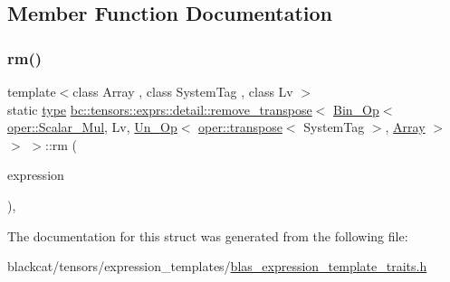\subsection{Member Function Documentation}
\mbox{\label{structbc_1_1tensors_1_1exprs_1_1detail_1_1remove__transpose_3_01Bin__Op_3_01oper_1_1Scalar__Mul_66d4ba5d587ca66fdce7c61c9a3f28e3_a3da4bd97ac2349ef2f88c949594846fc}} 
\subsubsection{\texorpdfstring{rm()}{rm()}}
{\footnotesize\ttfamily template$<$class Array , class System\+Tag , class Lv $>$ \\
static \hyperlink{structbc_1_1tensors_1_1exprs_1_1detail_1_1remove__transpose_3_01Bin__Op_3_01oper_1_1Scalar__Mul_66d4ba5d587ca66fdce7c61c9a3f28e3_a7fed62515e6f0c29ccb40182677a96c7}{type} \hyperlink{structbc_1_1tensors_1_1exprs_1_1detail_1_1remove__transpose}{bc\+::tensors\+::exprs\+::detail\+::remove\+\_\+transpose}$<$ \hyperlink{structbc_1_1tensors_1_1exprs_1_1Bin__Op}{Bin\+\_\+\+Op}$<$ \hyperlink{structbc_1_1oper_1_1Scalar__Mul}{oper\+::\+Scalar\+\_\+\+Mul}, Lv, \hyperlink{structbc_1_1tensors_1_1exprs_1_1Un__Op}{Un\+\_\+\+Op}$<$ \hyperlink{structbc_1_1oper_1_1transpose}{oper\+::transpose}$<$ System\+Tag $>$, \hyperlink{structbc_1_1tensors_1_1exprs_1_1Array}{Array} $>$ $>$ $>$\+::rm (\begin{DoxyParamCaption}\item[{\hyperlink{structbc_1_1tensors_1_1exprs_1_1Bin__Op}{Bin\+\_\+\+Op}$<$ \hyperlink{structbc_1_1oper_1_1Scalar__Mul}{oper\+::\+Scalar\+\_\+\+Mul}, Lv, \hyperlink{structbc_1_1tensors_1_1exprs_1_1Un__Op}{Un\+\_\+\+Op}$<$ \hyperlink{structbc_1_1oper_1_1transpose}{oper\+::transpose}$<$ System\+Tag $>$, \hyperlink{structbc_1_1tensors_1_1exprs_1_1Array}{Array} $>$$>$}]{expression }\end{DoxyParamCaption})\hspace{0.3cm}{\ttfamily [inline]}, {\ttfamily [static]}}



The documentation for this struct was generated from the following file\+:\begin{DoxyCompactItemize}
\item 
blackcat/tensors/expression\+\_\+templates/\hyperlink{blas__expression__template__traits_8h}{blas\+\_\+expression\+\_\+template\+\_\+traits.\+h}\end{DoxyCompactItemize}
